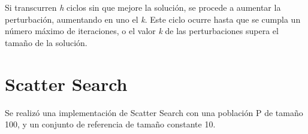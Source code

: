 \documentclass{ci5652}
\begin{document}
Si transcurren \textit{h} ciclos sin que mejore la solución, se procede a aumentar la perturbación, aumentando en uno el \textit{k}. Este ciclo ocurre hasta que se cumpla un número máximo de iteraciones, o el valor \textit{k} de las perturbaciones supera el tamaño de la solución.

%
%

\section{Scatter Search}
Se realizó una implementación de Scatter Search con una población P de tamaño 100, y un conjunto de referencia de tamaño constante 10.
\end{document}
